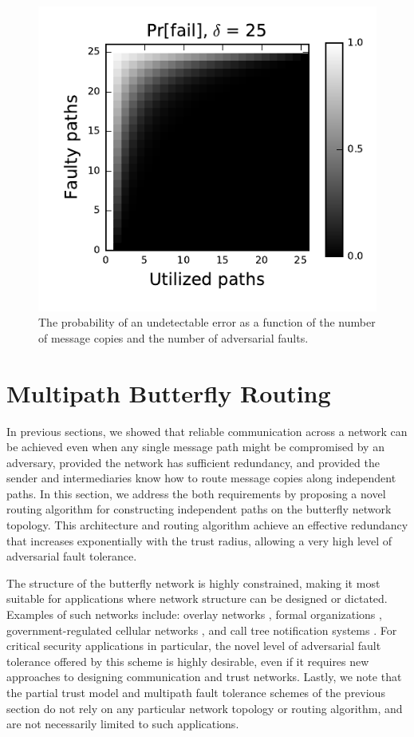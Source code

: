 \documentclass{sig-alternate-05-2015}
\begin{document}
\begin{figure}
\centerline{\includegraphics{fig-perror}}
\caption{
The probability of an undetectable error as a function of the number of
message copies and the number of adversarial faults.
}
\label{fig:pfail}
\end{figure}

\section{Multipath Butterfly Routing}
\label{sec-butterfly}

In previous sections, we showed that reliable communication across a network
can be achieved even when any single message path might be compromised by
an adversary,
provided the network has sufficient redundancy,
and provided the sender and intermediaries know how to route message
copies along independent paths.
In this section, we address the both requirements by proposing a novel routing
algorithm for constructing independent paths on the butterfly network topology.
This architecture and routing algorithm achieve an
effective redundancy that increases exponentially with the trust radius,
allowing a very high level of adversarial fault tolerance.

The structure of the butterfly network is highly constrained,
making it most suitable for applications where network structure can be
designed or dictated.
Examples of such networks include:
overlay networks \cite{lua_survey_2005, korzun_structured_2013},
formal organizations \cite{mohr_explaining_1982},
government-regulated cellular networks \cite{walker_mass_2012},
and call tree notification systems \cite{nickerson_thinking_2010}.
For critical security applications in particular,
the novel level of adversarial fault tolerance offered by this scheme
is highly desirable,
even if it requires new approaches to designing communication
and trust networks.
Lastly, we note that the partial trust model and multipath fault tolerance
schemes of the previous section do not rely on any particular network
topology or routing algorithm,
and are not necessarily limited to such applications.
\end{document}
